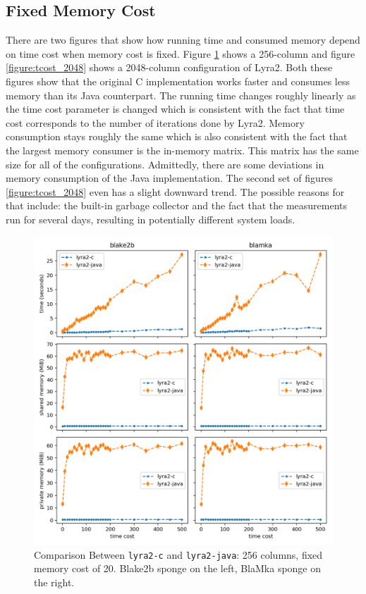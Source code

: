 \subsection{Fixed Memory Cost}
\label{sec:fixed-memory-cost}

There are two figures that show how running time and consumed memory depend on time cost when memory cost is fixed. Figure \ref{figure:tcost_256} shows a 256-column and figure \ref{figure:tcost_2048} shows a 2048-column configuration of Lyra2. Both these figures show that the original C implementation works faster and consumes less memory than its Java counterpart. The running time changes roughly linearly as the time cost parameter is changed which is consistent with the fact that time cost corresponds to the number of iterations done by Lyra2. Memory consumption stays roughly the same which is also consistent with the fact that the largest memory consumer is the in-memory matrix. This matrix has the same size for all of the configurations. Admittedly, there are some deviations in memory consumption of the Java implementation. The second set of figures \ref{figure:tcost_2048} even has a slight downward trend. The possible reasons for that include: the built-in garbage collector and the fact that the measurements run for several days, resulting in potentially different system loads.

\begin{figure}[H]
    \centering
    \includegraphics[width=\linewidth,keepaspectratio]{figures/tcost_256}
    \caption{Comparison Between \texttt{lyra2-c} and \texttt{lyra2-java}: 256 columns, fixed memory cost of 20. Blake2b sponge on the left, BlaMka sponge on the right.}
    \label{figure:tcost_256}
\end{figure}

